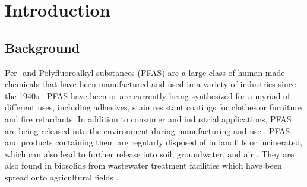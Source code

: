 \documentclass[
  super,
  preprint,
  3p]{elsarticle}
\begin{document}
\hypertarget{introduction}{%
\section{Introduction}\label{introduction}}

\hypertarget{sec-intro}{%
\subsection{Background}\label{sec-intro}}

Per- and Polyfluoroalkyl substances (PFAS) are a large class of
human-made chemicals that have been manufactured and used in a variety
of industries since the 1940s
\citep{wang_never-ending_2017, gluge_overview_2020, gaines_historical_2023}.
PFAS have been or are currently being synthesized for a myriad of
different uses, including adhesives, stain resistant coatings for
clothes or furniture and fire retardants. In addition to consumer and
industrial applications, PFAS are being released into the environment
during manufacturing and use \citep{wallis_source_2023}. PFAS and
products containing them are regularly disposed of in landfills or
incinerated, which can also lead to further release into soil,
groundwater, and air \citep{chen_evaluation_2023, li_critical_2023}.
They are also found in biosolids from wastewater treatment facilities
which have been spread onto agricultural fields
\citep{bolan_distribution_2021}.
\end{document}

